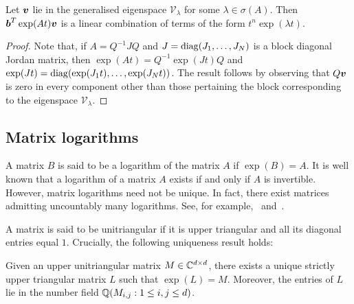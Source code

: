 \begin{proposition}
  Let $\boldsymbol{v}$ lie in the generalised eigenspace
  $\mathcal{V}_{\lambda}$ for some $\lambda \in \sigma(A)$.  Then
  $\boldsymbol{b}^{T}\exp(At)\boldsymbol{v}$ is a linear combination
  of terms of the form $t^{n}\exp(\lambda t)$.
\label{prop:linear}
\end{proposition}

\begin{proof}
  Note that, if $A=Q^{-1}JQ$ and $J=\operatorname{diag}(J_{1},\ldots,J_{N})$ is a block diagonal Jordan matrix, then $\exp(At)=Q^{-1}\exp(Jt)Q$ and $\exp(Jt)=\operatorname{diag}(\exp(J_{1}t),\ldots,\exp(J_{N}t))$.
The result follows by observing that $Q\boldsymbol{v}$ is zero in every component other than those pertaining the block corresponding to the eigenspace $\mathcal{V}_{\lambda}$.
\end{proof}

\subsection{Matrix logarithms}

A matrix $B$ is said to be a logarithm of the matrix $A$ if $\exp(B) = A$. It is well known that a logarithm of a matrix $A$ exists if and only if $A$ is invertible. However, matrix logarithms need not be unique. In fact, there exist matrices admitting uncountably many logarithms. See, for example,~\cite{MatrixLogs1} and~\cite{MatrixLogs2}.

A matrix is said to be unitriangular if it is upper triangular and all its diagonal entries equal $1$. Crucially, the following uniqueness result holds:

\begin{theorem}
\label{thm:log_uniqueness}
Given an upper unitriangular matrix $M \in \mathbb{C}^{d \times d}$, there exists a unique strictly upper triangular matrix $L$ such that $\exp(L)=M$. Moreover, the entries of $L$ lie in the number field $\mathbb{Q}(M_{i,j}: 1 \leq i,j \leq d)$.
\end{theorem}

